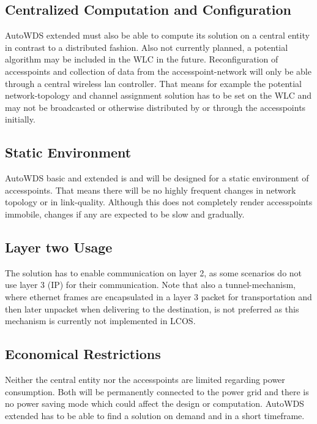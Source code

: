     \subsection{Centralized Computation and Configuration}
      AutoWDS extended must also be able to compute its solution on a central entity in contrast to a distributed fashion.
      Also not currently planned, a potential algorithm may be included in the WLC in the future.
      Reconfiguration of accesspoints and collection of data from the accesspoint-network will only be able through a central wireless lan controller.
      That means for example the potential network-topology and channel assignment solution has to be set on the WLC and may not be broadcasted or otherwise
      distributed by or through the accesspoints initially.
      
    \subsection{Static Environment}
      AutoWDS basic and extended is and will be designed for a static environment of accesspoints. That means there will be no highly frequent changes in
      network topology or in link-quality. Although this does not completely render accesspoints immobile, changes if any are expected to be slow and gradually.
      
    \subsection{Layer two Usage}
      The solution has to enable communication on layer 2, as some scenarios do not use layer 3 (IP) for their communication.
      Note that also a tunnel-mechanism, where ethernet frames are encapsulated in a layer 3 packet for transportation and then later unpacket when delivering to the destination,
      is not preferred as this mechanism is currently not implemented in LCOS.
    
    \subsection{Economical Restrictions}
      Neither the central entity nor the accesspoints are limited regarding power consumption. 
      Both will be permanently connected to the power grid and there is no power saving mode which could affect the design or computation.
      AutoWDS extended has to be able to find a solution on demand and in a short timeframe.
  